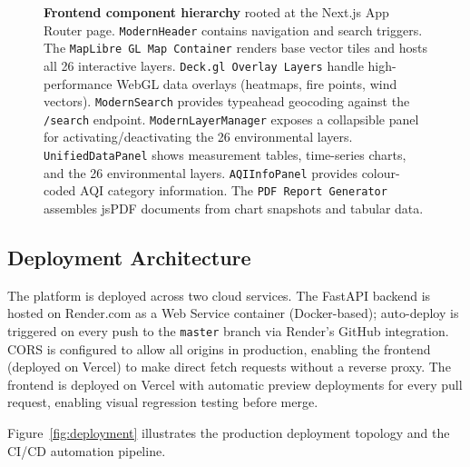 \documentclass[12pt,a4paper]{article}
\begin{document}
\begin{figure}[H]
\begin{tikzpicture}
\end{tikzpicture}
\caption[Frontend component hierarchy]{%
  \textbf{Frontend component hierarchy} rooted at the Next.js App Router page.
  \texttt{ModernHeader} contains navigation and search triggers.
  The \texttt{MapLibre GL Map Container} renders base vector tiles and hosts
  all 26 interactive layers. \texttt{Deck.gl Overlay Layers} handle
  high-performance WebGL data overlays (heatmaps, fire points, wind vectors).
  \texttt{ModernSearch} provides typeahead geocoding against the
  \texttt{/search} endpoint. \texttt{ModernLayerManager} exposes a collapsible
  panel for activating/deactivating the 26 environmental layers.
  \texttt{UnifiedDataPanel} shows measurement tables, time-series charts, and
  the 26 environmental layers. \texttt{AQIInfoPanel} provides colour-coded
  AQI category information. The \texttt{PDF Report Generator} assembles jsPDF
  documents from chart snapshots and tabular data.}
\label{fig:frontend}
\end{figure}

\subsection{Deployment Architecture}
\label{sec:sysdesign:deploy}

The platform is deployed across two cloud services. The FastAPI backend is hosted
on Render.com as a Web Service container (Docker-based); auto-deploy is triggered
on every push to the \texttt{master} branch via Render's GitHub integration.
CORS is configured to allow all origins in production, enabling the frontend
(deployed on Vercel) to make direct fetch requests without a reverse proxy.
The frontend is deployed on Vercel with automatic preview deployments for
every pull request, enabling visual regression testing before merge.

Figure~\ref{fig:deployment} illustrates the production deployment topology
and the CI/CD automation pipeline.
\end{document}
